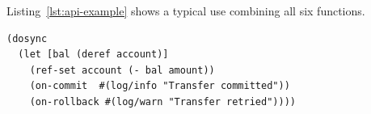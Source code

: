 \noindent Listing~\ref{lst:api-example} shows a typical use combining all six
functions.

\begin{listing}[ht]
  \begin{verbatim}
(dosync
  (let [bal (deref account)]
    (ref-set account (- bal amount))
    (on-commit  #(log/info "Transfer committed"))
    (on-rollback #(log/warn "Transfer retried"))))
\end{verbatim}
  \caption{Typical usage of the public API: transactional transfer with lifecycle hooks.}
  \label{lst:api-example}
\end{listing}